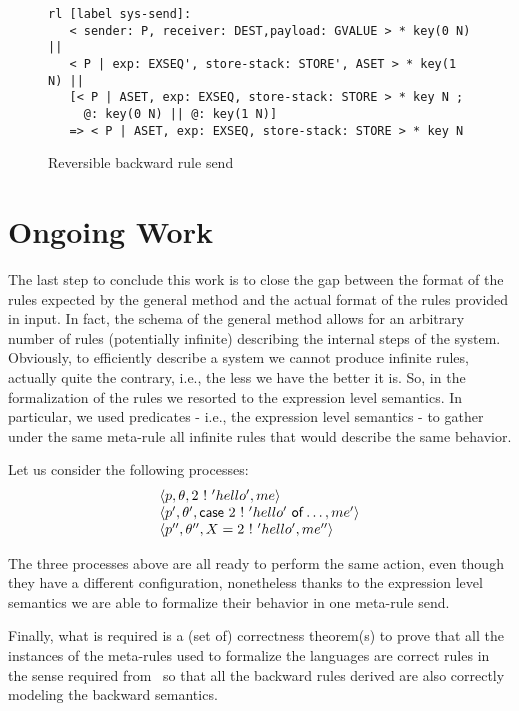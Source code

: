 \documentclass{article}[12pt,a4paper]
\theoremstyle{definition}
\begin{document}
\begin{figure}[t]
  \centering
\begin{verbatim}
rl [label sys-send]:
   < sender: P, receiver: DEST,payload: GVALUE > * key(0 N) || 
   < P | exp: EXSEQ', store-stack: STORE', ASET > * key(1 N) || 
   [< P | ASET, exp: EXSEQ, store-stack: STORE > * key N ;
     @: key(0 N) || @: key(1 N)]
   => < P | ASET, exp: EXSEQ, store-stack: STORE > * key N 
\end{verbatim}
  
  \caption{Reversible backward rule send}
  \label{fig:revsend}
\end{figure}


\section{Ongoing Work}\label{sec:ongoing-work}

The last step to conclude this work is to close the gap between the format of
the rules expected by the general method and the actual format of the rules
provided in input. In fact, the schema of the general method allows for an
arbitrary number of rules (potentially infinite) describing the internal steps
of the system. Obviously, to efficiently describe a system we cannot produce
infinite rules, actually quite the contrary, i.e., the less we have the better
it is. So, in the formalization of the rules we resorted to the expression level
semantics. In particular, we used predicates - i.e., the expression level semantics - to gather
under the same meta-rule all infinite rules that would describe the same
behavior.

Let us consider the following processes:
\[
  \begin{array}{l}
    \langle p, \theta, 2~\mathsf{!}~'hello', me\rangle\\
    \langle p', \theta', \mathsf{case}~2~\mathsf{!}~'hello'~\mathsf{of} \ldots, me'\rangle\\
    \langle p'', \theta'', X = 2~\mathsf{!}~'hello', me''\rangle 
  \end{array}
\]

The three processes above are all ready to perform the same action, even though
they have a different configuration, nonetheless thanks to the expression level
semantics we are able to formalize their behavior in one meta-rule send.

Finally, what is required is a (set of) correctness theorem(s) to prove that all
the instances of the meta-rules used to formalize the languages are correct
rules in the sense required from~\cite{LaneseM20} so that all the backward rules
derived are also correctly modeling the backward semantics.
\end{document}
